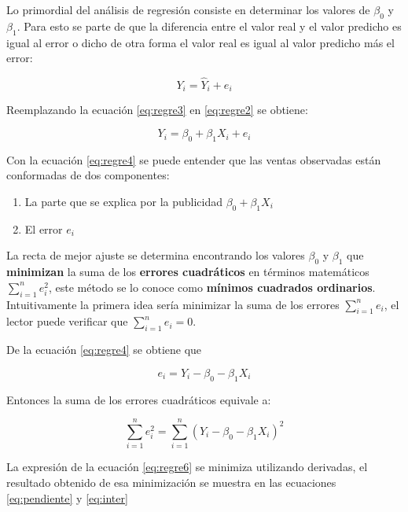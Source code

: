 \documentclass[letterpaper,]{book}
\providecommand{\tightlist}{%
  \setlength{\itemsep}{0pt}\setlength{\parskip}{0pt}}
\begin{document}
Lo primordial del análisis de regresión consiste en determinar los valores de \(\beta_0\) y \(\beta_1\). Para esto se parte de que la diferencia entre el valor real y el valor predicho es igual al error o dicho de otra forma el valor real es igual al valor predicho más el error:

\begin{equation}
Y_i=\hat{Y}_i+e_i 
    \label{eq:regre3}
\end{equation}

Reemplazando la ecuación \eqref{eq:regre3} en \eqref{eq:regre2} se obtiene:

\begin{equation}
Y_i=\beta_0 + \beta_1 X_i+e_i 
    \label{eq:regre4}
\end{equation}

Con la ecuación \eqref{eq:regre4} se puede entender que las ventas observadas están conformadas de dos componentes:

\begin{enumerate}
\def\labelenumi{\arabic{enumi}.}
\tightlist
\item
  La parte que se explica por la publicidad \(\beta_0 + \beta_1 X_i\)
\item
  El error \(e_i\)
\end{enumerate}

La recta de mejor ajuste se determina encontrando los valores \(\beta_0\) y \(\beta_1\) que \textbf{minimizan} la suma de los \textbf{errores cuadráticos} en términos matemáticos \(\sum_{i=1}^{n}{e_i^2}\), este método se lo conoce como \textbf{mínimos cuadrados ordinarios}. Intuitivamente la primera idea sería minimizar la suma de los errores \(\sum_{i=1}^{n}{e_i}\), el lector puede verificar que \(\sum_{i=1}^{n}{e_i}=0\).

De la ecuación \eqref{eq:regre4} se obtiene que

\begin{equation}
e_i = Y_i-\beta_0 - \beta_1 X_i
    \label{eq:regre5}
\end{equation}

Entonces la suma de los errores cuadráticos equivale a:

\begin{equation}
\sum_{i=1}^{n}{e_i^2} = \sum_{i=1}^{n}{\left(Y_i-\beta_0 - \beta_1 X_i\right)^2}
    \label{eq:regre6}
\end{equation}

La expresión de la ecuación \eqref{eq:regre6} se minimiza utilizando derivadas, el resultado obtenido de esa minimización se muestra en las ecuaciones \eqref{eq:pendiente} y \eqref{eq:inter}
\end{document}
